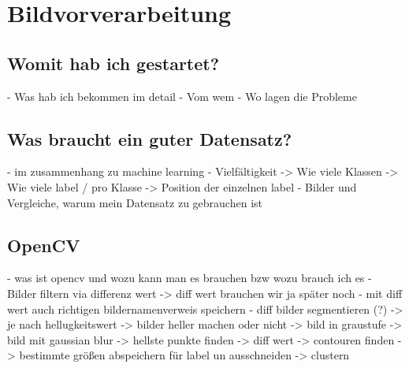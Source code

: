 
\chapter{Bildvorverarbeitung}
\label{sec:preprocessing}

\section{Womit hab ich gestartet?}
- Was hab ich bekommen im detail
- Vom wem
- Wo lagen die Probleme
\section{Was braucht ein guter Datensatz?}
- im zusammenhang zu machine learning
- Vielfältigkeit
 -> Wie viele Klassen
 -> Wie viele label / pro Klasse
 -> Position der einzelnen label
 - Bilder und Vergleiche, warum mein Datensatz zu gebrauchen ist

\section{OpenCV}
- was ist opencv und wozu kann man es brauchen bzw wozu brauch ich es
- Bilder filtern via differenz wert 
 -> diff wert brauchen wir ja später noch 
 - mit diff wert auch richtigen bildernamenverweis speichern
 - diff bilder segmentieren (?)
  -> je nach hellugkeitswert
  -> bilder heller machen oder nicht
  -> bild in graustufe
  -> bild mit gaussian blur 
  -> hellste punkte finden -> diff wert 
  -> contouren finden 
  -> bestimmte größen abspeichern für label un ausschneiden
  -> clustern 
